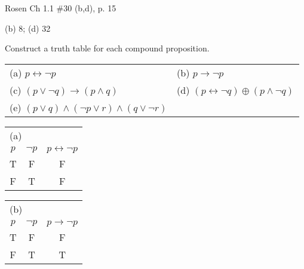 \documentclass[12pt,addpoints]{exam}
\newcommand{\ra}{\rightarrow}
\newcommand{\lra}{\leftrightarrow}
\newcommand{\xor}{\oplus}
\begin{document}
\begin{questions}
\question[2] Rosen Ch 1.1 \#30 (b,d), p. 15
    \ifprintanswers
        \vspace{-15pt}
    \fi
    \begin{solution} (b) 8;  (d) 32
    \end{solution}



\question[20]\label{tt} Construct a truth table for each compound proposition.
    \ifprintanswers
        \vspace{-10pt}
    \fi
    \footnotesize
    \begin{center}
    \begin{tabular}{ll}
       (a) $p \lra \neg p$  & (b) $p \ra \neg p$ \\
       (c) $(p \vee \neg q) \ra (p \wedge q)$ & (d) $ (p \lra \neg q) \xor (p \wedge \neg q)$ \\
       (e) %
       $(p \vee q) \wedge (\neg p \vee r) \wedge (q \vee \neg r)$
    \end{tabular}
    \end{center}
    \normalsize
    \ifprintanswers
        \vspace{-15pt}
    \fi
    \begin{solution}
    \footnotesize
        \begin{tabular}{c|c||c}
            \multicolumn{3}{l}{ (a) } \\
            $p$ & $\neg p$ & $p \lra \neg p$ \\
         \hline
            T & F & F \\
            F & T & F \\
         \end{tabular} \hspace{1in}
         \begin{tabular}{c|c||c}
            \multicolumn{3}{l}{ (b) } \\
            $p$ & $\neg p$ & $p \ra \neg p$ \\
         \hline
            T & F & F \\
            F & T & T \\
         \end{tabular}


\end{solution}
\end{questions}
\end{document}
